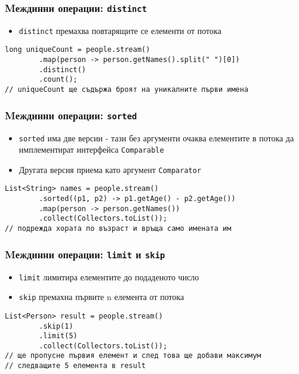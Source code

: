 \documentclass[ignorenonframetext, hyperref=unicode,compress,pdflatex]{beamer}
\begin{document}
\begin{frame}[containsverbatim]\frametitle{Mеждинни операции:
\lstinline{distinct}}
\begin{itemize}
  \item \lstinline{distinct} премахва повтарящите се елементи от потока 
\end{itemize}
\begin{lstlisting}
long uniqueCount = people.stream()
		.map(person -> person.getNames().split(" ")[0])
		.distinct()
		.count();
// uniqueCount ще съдържа броят на уникалните първи имена
\end{lstlisting}
\end{frame}

\begin{frame}[containsverbatim]\frametitle{Mеждинни операции:
\lstinline{sorted}}
\begin{itemize}
  \item \lstinline{sorted} има две версии - тази без аргументи очаква елементите
  в потока да имплементират интерфейса \lstinline{Comparable}
  \item Другата версия приема като аргумент \lstinline{Comparator}
\end{itemize}
\begin{lstlisting}
List<String> names = people.stream()
		.sorted((p1, p2) -> p1.getAge() - p2.getAge())
		.map(person -> person.getNames())
		.collect(Collectors.toList());
// подрежда хората по възраст и връща само имената им
\end{lstlisting}
\end{frame}

\begin{frame}[containsverbatim]\frametitle{Mеждинни операции:
\lstinline{limit} и \lstinline{skip}}
\begin{itemize}
  \item \lstinline{limit} лимитира елементите до подаденото число
  \item \lstinline{skip} премахна първите n елемента от потока 
\end{itemize}
\begin{lstlisting}
List<Person> result = people.stream()
		.skip(1)
		.limit(5)
		.collect(Collectors.toList());
// ще пропусне първия елемент и след това ще добави максимум 
// следващите 5 елемента в result
\end{lstlisting}
\end{frame}
\end{document}
